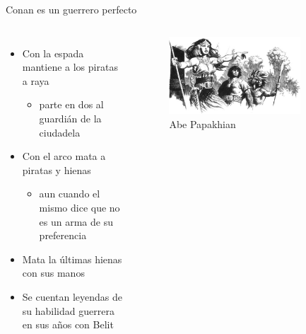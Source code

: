 \begin{frame}{Conan es un guerrero perfecto}
	\begin{columns}
		\begin{itemize}
			\item Con la espada mantiene a los piratas a raya
			\begin{itemize}
				\item parte en dos al guardián de la ciudadela
			\end{itemize}
			\item Con el arco mata a piratas y hienas
			\begin{itemize}
				\item aun cuando el mismo dice que no es un arma de su preferencia
			\end{itemize}
			\item Mata la últimas hienas con sus manos
			\item Se cuentan leyendas de su habilidad guerrera en sus años con Belit
		\end{itemize}
		\begin{figure}[htb]
			\centering
			\includegraphics[width=0.8\textwidth]{img/tributos/elephant07}
			\caption{Abe Papakhian}
		\end{figure}
	\end{columns}
\end{frame}
\note[itemize]{
	\item
}

